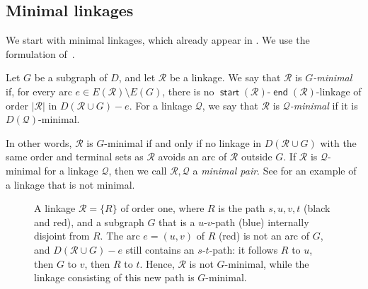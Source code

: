 \documentclass[fontsize=12pt,leading=14pt]{fullpaper}
\DeclareMathOperator{\st}{\mathsf{start}}
\DeclareMathOperator{\en}{\mathsf{end}}
\newcommand{\Qcal}{\mathcal{Q}}
\newcommand{\Rcal}{\mathcal{R}}
\begin{document}
\subsection{Minimal linkages}\label{sec:time-minimal}

We start with minimal linkages, which already appear in \textcite[Definition~2.13]{KawarabayashiK15}.
We use the formulation of~\cite[Definition~2.3]{HKMM26a}.

\begin{definition}\label{def:minimal}
  Let $G$ be a subgraph of $D$, and let $\Rcal$ be a linkage.
  We say that $\Rcal$ is \emph{$G$-minimal} if, for every arc $e\in E(\Rcal)\setminus E(G)$, there is no $\st(\Rcal)$-$\en(\Rcal)$-linkage of order $|\Rcal|$ in $D(\Rcal\cup G)-e$.
  For a linkage $\Qcal$, we say that $\Rcal$ is \emph{$\Qcal$-minimal} if it is $D(\Qcal)$-minimal.
\end{definition}

In other words, $\Rcal$ is $G$-minimal if and only if no linkage in $D(\Rcal\cup G)$ with the same order and terminal sets as $\Rcal$ avoids an arc of $\Rcal$ outside $G$.
If $\Rcal$ is $\Qcal$-minimal for a linkage $\Qcal$, then we call $\Rcal,\Qcal$ a \emph{minimal pair}.
See  for an example of a linkage that is not minimal.

\begin{figure}[ht]
  \centering
  \caption{A linkage $\Rcal=\{R\}$ of order one, where $R$ is the path $s,u,v,t$ (black and red), and a subgraph $G$ that is a $u$-$v$-path (blue) internally disjoint from $R$.
    The arc $e=(u,v)$ of $R$ (red) is not an arc of $G$, and $D(\Rcal\cup G)-e$ still contains an $s$-$t$-path: it follows $R$ to $u$, then $G$ to $v$, then $R$ to $t$.
  Hence, $\Rcal$ is not $G$-minimal, while the linkage consisting of this new path is $G$-minimal.}
  \label{fig:minimal}
\end{figure}
\end{document}
